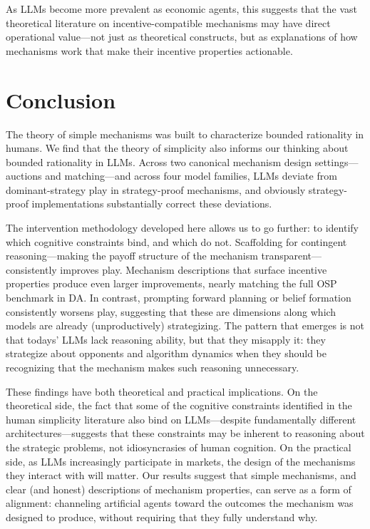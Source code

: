 \documentclass[format=acmsmall, review=false]{acmart}
\begin{document}
As LLMs become more prevalent as economic agents, this suggests that the vast theoretical literature on incentive-compatible mechanisms may have direct operational value---not just as theoretical constructs, but as explanations of how mechanisms work that make their incentive properties actionable.

\section{Conclusion} \label{sec:conclusion}

The theory of simple mechanisms was built to characterize bounded rationality in humans. We find that the theory of simplicity also informs our thinking about bounded rationality in LLMs. Across two canonical mechanism design settings---auctions and matching---and across four model families, LLMs deviate from dominant-strategy play in strategy-proof mechanisms, and obviously strategy-proof implementations substantially correct these deviations.

The intervention methodology developed here allows us to go further: to identify which cognitive constraints bind, and which do not. Scaffolding for contingent reasoning---making the payoff structure of the mechanism transparent---consistently improves play. Mechanism descriptions that surface incentive properties produce even larger improvements, nearly matching the full OSP benchmark in DA. In contrast, prompting forward planning or belief formation consistently worsens play, suggesting that these are dimensions along which models are already (unproductively) strategizing. The pattern that emerges is not that todays' LLMs lack reasoning ability, but that they misapply it: they strategize about opponents and algorithm dynamics when they should be recognizing that the mechanism makes such reasoning unnecessary.

These findings have both theoretical and practical implications. On the theoretical side, the fact that some of the cognitive constraints identified in the human simplicity literature also bind on LLMs---despite fundamentally different architectures---suggests that these constraints may be inherent to reasoning about the strategic problems, not idiosyncrasies of human cognition. On the practical side, as LLMs increasingly participate in markets, the design of the mechanisms they interact with will matter. Our results suggest that simple mechanisms, and clear (and honest) descriptions of mechanism properties, can serve as a form of alignment: channeling artificial agents toward the outcomes the mechanism was designed to produce, without requiring that they fully understand why.
\end{document}
